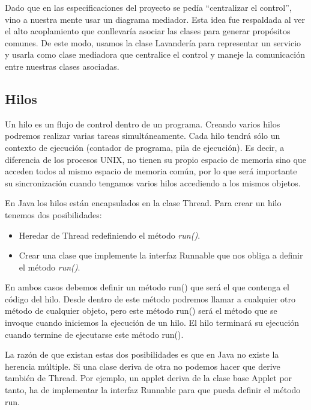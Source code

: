 \documentclass[12pt]{article}
\begin{document}
\par Dado que en las especificaciones del proyecto se pedía ``centralizar el control'', vino a nuestra mente usar un diagrama mediador. Esta idea fue respaldada al ver el alto acoplamiento que conllevaría asociar las clases para generar propósitos comunes. De este modo, usamos la clase Lavandería para representar un servicio y usarla como clase mediadora que centralice el control y maneje la comunicación entre nuestras clases asociadas.

\subsection{Hilos}
Un hilo es un flujo de control dentro de un programa. Creando varios hilos podremos realizar varias tareas simultáneamente. Cada hilo tendrá sólo un contexto de ejecución (contador de programa, pila de ejecución). Es decir, a diferencia de los procesos UNIX, no tienen su propio espacio de memoria sino que acceden todos al mismo espacio de memoria común, por lo que será importante su sincronización cuando tengamos varios hilos accediendo a los mismos objetos. 

\par En Java los hilos están encapsulados en la clase Thread. Para crear un hilo tenemos dos posibilidades: 

\begin{itemize}
\item Heredar de Thread redefiniendo el método \textit{run()}. 
\item Crear una clase que implemente la interfaz Runnable que nos obliga a definir el método \textit{run()}. 
\end{itemize}

\par En ambos casos debemos definir un método run() que será el que contenga el código del hilo. Desde dentro de este método podremos llamar a cualquier otro método de cualquier objeto, pero este método run() será el método que se invoque cuando iniciemos la ejecución de un hilo. El hilo terminará su ejecución cuando termine de ejecutarse este método run(). 

\par La razón de que existan estas dos posibilidades es que en Java no existe la herencia múltiple. Si una clase deriva de otra no podemos hacer que derive también de Thread. Por ejemplo, un applet deriva de la clase base Applet por tanto, ha de implementar la interfaz Runnable para que pueda definir el método run. 
\end{document}
